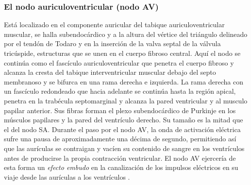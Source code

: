 \documentclass[12pt,letterpaper,oneside,openright]{book}
\begin{document}
	\subsubsection*{El nodo auriculoventricular (nodo AV)}
	Está localizado en el componente auricular del tabique auriculoventricular muscular, se halla subendocárdico y a la altura del vértice del triángulo delineado por el tendón de Todaro y en la inserción de la valva septal de la válvula tricúspide, estructuras que se unen en el cuerpo fibroso central. Aquí el nodo se continúa como el fascículo auriculoventricular que penetra el cuerpo fibroso y alcanza la cresta del tabique interventricular muscular debajo del septo membranoso y se bifurca en una rama derecha e izquierda. La rama derecha con un fascículo redondeado que hacia adelante se continúa hasta la región apical, penetra en la trabécula septomarginal y alcanza la pared ventricular y al musculo papilar anterior. Sus fibras forman el plexo subendocárdico de Purkinje en los músculos papilares y la pared del ventrículo derecho. Su tamaño es la mitad que el del nodo SA. Durante el paso por el nodo AV, la onda de activación eléctrica sufre una pausa de aproximadamente una décima de segundo, permitiendo así que las aurículas se contraigan y vacíen su contenido de sangre en los ventrículos antes de producirse la propia contracción ventricular. El nodo AV ejercería de esta forma un \textit{efecto embudo} en la canalización de los impulsos eléctricos en su viaje desde las aurículas a los ventrículos \cite{fbbva}.
\end{document}

